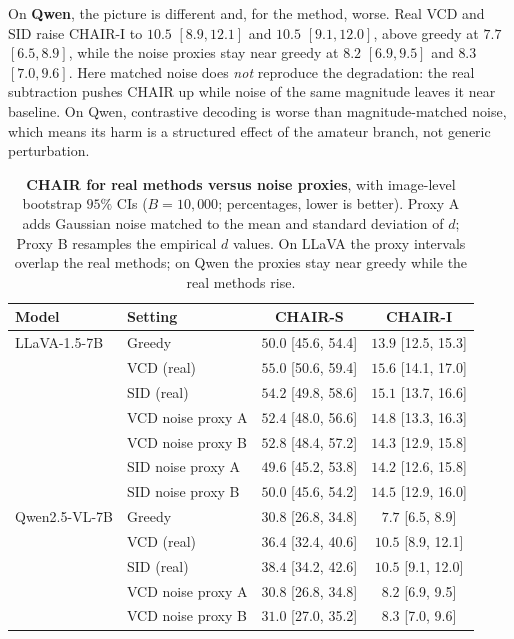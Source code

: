 \documentclass{article}
\begin{document}
On \textbf{Qwen}, the picture is different and, for the method, worse. Real VCD
and SID raise CHAIR-I to $10.5$ $[8.9, 12.1]$ and $10.5$ $[9.1, 12.0]$, above
greedy at $7.7$ $[6.5, 8.9]$, while the noise proxies stay near greedy at $8.2$
$[6.9, 9.5]$ and $8.3$ $[7.0, 9.6]$. Here matched noise does \emph{not} reproduce
the degradation: the real subtraction pushes CHAIR up while noise of the same
magnitude leaves it near baseline. On Qwen, contrastive decoding is worse than
magnitude-matched noise, which means its harm is a structured effect of the
amateur branch, not generic perturbation.

\begin{table}[t]
\centering
\small
\setlength{\tabcolsep}{5pt}
\caption{\textbf{CHAIR for real methods versus noise proxies}, with image-level
bootstrap $95\%$ CIs ($B=10{,}000$; percentages, lower is better). Proxy A adds
Gaussian noise matched to the mean and standard deviation of $d$; Proxy B
resamples the empirical $d$ values. On LLaVA the proxy intervals overlap the real
methods; on Qwen the proxies stay near greedy while the real methods rise.}
\label{tab:dproxy-chair}
\begin{tabular}{llcc}
\toprule
Model & Setting & CHAIR-S & CHAIR-I \\
\midrule
LLaVA-1.5-7B & Greedy & $50.0$ \tiny{[45.6, 54.4]} & $13.9$ \tiny{[12.5, 15.3]} \\
 & VCD (real) & $55.0$ \tiny{[50.6, 59.4]} & $15.6$ \tiny{[14.1, 17.0]} \\
 & SID (real) & $54.2$ \tiny{[49.8, 58.6]} & $15.1$ \tiny{[13.7, 16.6]} \\
 & VCD noise proxy A & $52.4$ \tiny{[48.0, 56.6]} & $14.8$ \tiny{[13.3, 16.3]} \\
 & VCD noise proxy B & $52.8$ \tiny{[48.4, 57.2]} & $14.3$ \tiny{[12.9, 15.8]} \\
 & SID noise proxy A & $49.6$ \tiny{[45.2, 53.8]} & $14.2$ \tiny{[12.6, 15.8]} \\
 & SID noise proxy B & $50.0$ \tiny{[45.6, 54.2]} & $14.5$ \tiny{[12.9, 16.0]} \\
\midrule
Qwen2.5-VL-7B & Greedy & $30.8$ \tiny{[26.8, 34.8]} & $7.7$ \tiny{[6.5, 8.9]} \\
 & VCD (real) & $36.4$ \tiny{[32.4, 40.6]} & $10.5$ \tiny{[8.9, 12.1]} \\
 & SID (real) & $38.4$ \tiny{[34.2, 42.6]} & $10.5$ \tiny{[9.1, 12.0]} \\
 & VCD noise proxy A & $30.8$ \tiny{[26.8, 34.8]} & $8.2$ \tiny{[6.9, 9.5]} \\
 & VCD noise proxy B & $31.0$ \tiny{[27.0, 35.2]} & $8.3$ \tiny{[7.0, 9.6]} \\
\bottomrule
\end{tabular}
\end{table}
\end{document}
